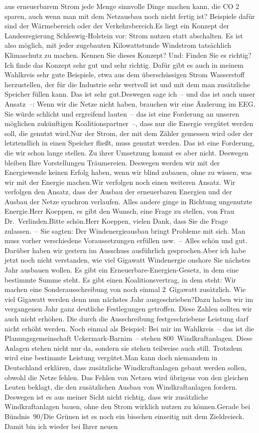 \documentclass{article}
\begin{document}
aus erneuerbarem Strom jede Menge sinnvolle Dinge machen kann, die CO 2 sparen, auch wenn man mit dem Netzausbau noch nicht fertig ist? Beispiele dafür sind der Wärmebereich oder der Verkehrsbereich.Es liegt ein Konzept der Landesregierung Schleswig-Holstein vor: Strom nutzen statt abschalten. Es ist also möglich, mit jeder zugebauten Kilowattstunde Windstrom tatsächlich Klimaschutz zu machen. Kennen Sie dieses Konzept? Und: Finden Sie es richtig?Ich finde das Konzept sehr gut und sehr richtig. Dafür gibt es auch in meinem Wahlkreis sehr gute Beispiele, etwa aus dem überschüssigen Strom Wasserstoff herzustellen, der für die Industrie sehr wertvoll ist und mit dem man zusätzliche Speicher füllen kann. Das ist sehr gut.Deswegen sage ich – und das ist auch unser Ansatz –: Wenn wir die Netze nicht haben, brauchen wir eine Änderung im EEG. Sie würde schlicht und ergreifend lauten – das ist eine Forderung an unseren möglichen zukünftigen Koalitionspartner –, dass nur die Energie vergütet werden soll, die genutzt wird.Nur der Strom, der mit dem Zähler gemessen wird oder der letztendlich in einen Speicher fließt, muss genutzt werden. Das ist eine Forderung, die wir schon lange stellen. Zu ihrer Umsetzung kommt es aber nicht. Deswegen bleiben Ihre Vorstellungen Träumereien. Deswegen werden wir mit der Energiewende keinen Erfolg haben, wenn wir blind zubauen, ohne zu wissen, was wir mit der Energie machen.Wir verfolgen noch einen weiteren Ansatz. Wir verfolgen den Ansatz, dass der Ausbau der erneuerbaren Energien und der Ausbau der Netze synchron verlaufen. Alles andere ginge in Richtung ungenutzte Energie.Herr Koeppen, es gibt den Wunsch, eine Frage zu stellen, von Frau Dr. Verlinden.Bitte schön.Herr Koeppen, vielen Dank, dass Sie die Frage zulassen. – Sie sagten: Der Windenergieausbau bringt Probleme mit sich. Man muss vorher verschiedene Voraussetzungen erfüllen usw. – Alles schön und gut. Darüber haben wir gestern im Ausschuss ausführlich gesprochen.Aber ich habe jetzt noch nicht verstanden, wie viel Gigawatt Windenergie onshore Sie nächstes Jahr ausbauen wollen. Es gibt ein Erneuerbare-Energien-Gesetz, in dem eine bestimmte Summe steht. Es gibt einen Koalitionsvertrag, in dem steht: Wir machen eine Sonderausschreibung von noch einmal 2 Gigawatt zusätzlich. Wie viel Gigawatt werden denn nun nächstes Jahr ausgeschrieben?Dazu haben wir im vergangenen Jahr ganz deutliche Festlegungen getroffen. Diese Zahlen sollten wir auch nicht erhöhen. Die durch die Ausschreibung festgeschriebene Leistung darf nicht erhöht werden. Noch einmal als Beispiel: Bei mir im Wahlkreis – das ist die Planungsgemeinschaft Uckermark-Barnim – stehen 800 Windkraftanlagen. Diese Anlagen stehen nicht nur da, sondern sie stehen teilweise auch still. Trotzdem wird eine bestimmte Leistung vergütet.Man kann doch niemandem in Deutschland erklären, dass zusätzliche Windkraftanlagen gebaut werden sollen, obwohl die Netze fehlen. Das Fehlen von Netzen wird übrigens von den gleichen Leuten beklagt, die den zusätzlichen Ausbau von Windkraftanlagen fordern. Deswegen ist es aus meiner Sicht nicht richtig, dass wir zusätzliche Windkraftanlagen bauen, ohne den Strom wirklich nutzen zu können.Gerade bei Bündnis 90/Die Grünen ist es noch ein bisschen einseitig mit dem Zieldreieck. Damit bin ich wieder bei Ihrer neuen 
\end{document}
